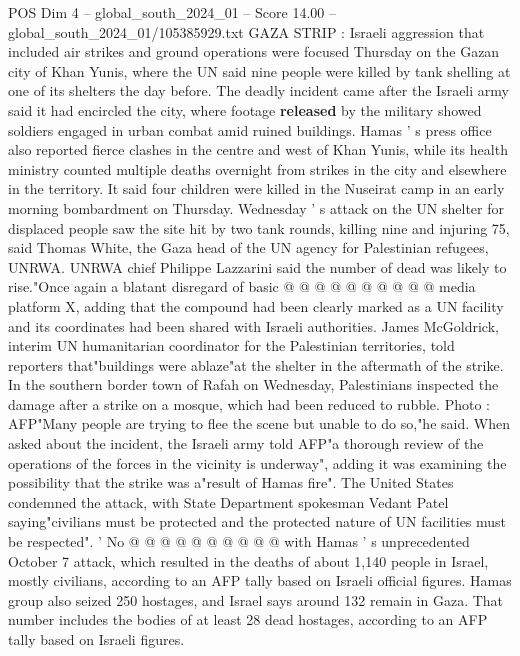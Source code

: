 \begin{textsample}{POS Dim 4 – global\_south\_2024\_01 – Score 14.00 – global\_south\_2024\_01/105385929.txt}  \label{ex:f4_pos_376}
GAZA STRIP : Israeli aggression that included air strikes and ground operations were focused Thursday on the Gazan city of Khan Yunis, where the UN said nine people were killed by tank shelling at one of its shelters the day before.
The deadly incident came after the Israeli army said it had encircled the city, where footage \textbf{released} by the military showed soldiers engaged in urban combat amid ruined buildings.
Hamas ' s press office also reported fierce clashes in the centre and west of Khan Yunis, while its health ministry counted multiple deaths overnight from strikes in the city and elsewhere in the territory.
It said four children were killed in the Nuseirat camp in an early morning bombardment on Thursday.
Wednesday ' s attack on the UN shelter for displaced people saw the site hit by two tank rounds, killing nine and injuring 75, said Thomas White, the Gaza head of the UN agency for Palestinian refugees, UNRWA.
UNRWA chief Philippe Lazzarini said the number of dead was likely to rise."Once again a blatant disregard of basic @ @ @ @ @ @ @ @ @ @ media platform X, adding that the compound had been clearly marked as a UN facility and its coordinates had been shared with Israeli authorities.
James McGoldrick, interim UN humanitarian coordinator for the Palestinian territories, told reporters that"buildings were ablaze"at the shelter in the aftermath of the strike.
In the southern border town of Rafah on Wednesday, Palestinians inspected the damage after a strike on a mosque, which had been reduced to rubble.
Photo : AFP"Many people are trying to flee the scene but unable to do so,"he said.
When asked about the incident, the Israeli army told AFP"a thorough review of the operations of the forces in the vicinity is underway", adding it was examining the possibility that the strike was a"result of Hamas fire".
The United States condemned the attack, with State Department spokesman Vedant Patel saying"civilians must be protected and the protected nature of UN facilities must be respected". ' No @ @ @ @ @ @ @ @ @ @ with Hamas ' s unprecedented October 7 attack, which resulted in the deaths of about 1,140 people in Israel, mostly civilians, according to an AFP tally based on Israeli official figures.
Hamas group also seized 250 hostages, and Israel says around 132 remain in Gaza.
That number includes the bodies of at least 28 dead hostages, according to an AFP tally based on Israeli figures.

\end{textsample}
